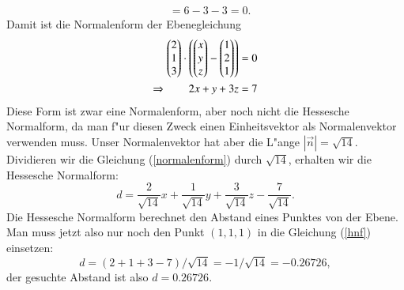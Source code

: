 \begin{beispiel}
\begin{align*}
&=6-3-3=0.
\end{align*}
Damit ist die Normalenform der Ebenegleichung
\begin{align}
\begin{pmatrix}2\\1\\3\end{pmatrix}\cdot\left(
\begin{pmatrix}x\\y\\z\end{pmatrix} - \begin{pmatrix}1\\2\\1\end{pmatrix}
\right)&=0\notag\\
\Rightarrow\qquad
2x+y+3z&=7\label{normalenform}
\end{align}
Diese Form ist zwar eine Normalenform, aber noch nicht die Hessesche
Normalform, da man f"ur diesen Zweck einen Einheitsvektor als
Normalenvektor verwenden muss. Unser Normalenvektor hat aber die
L"ange $|\vec n|=\sqrt{14}$. Dividieren wir die Gleichung (\ref{normalenform})
durch $\sqrt{14}$, erhalten wir die Hessesche Normalform:
\begin{equation}
d=\frac{2}{\sqrt{14}}x+\frac{1}{\sqrt{14}}y+\frac{3}{\sqrt{14}}z-\frac{7}{\sqrt{14}}.
\label{hnf}
\end{equation}
Die Hessesche Normalform berechnet den Abstand eines Punktes von der
Ebene. Man muss jetzt also nur noch den Punkt $(1,1,1)$ in die  Gleichung
(\ref{hnf}) einsetzen:
\[
d = (2+1+3-7)/\sqrt{14}=-1/\sqrt{14}=-0.26726,
\]
der gesuchte Abstand ist also $d=0.26726$.
\end{beispiel}

